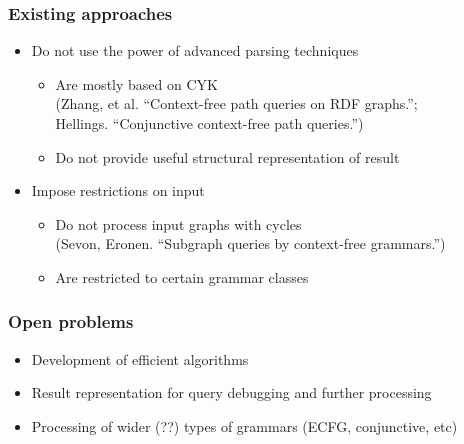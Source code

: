 \documentclass{beamer}
\begin{document}
\begin{frame}
  \transwipe[direction=90]
  \frametitle{Existing approaches}
  \begin{itemize}
    \item Do not use the power of advanced parsing techniques
    \begin{itemize}
       \item Are mostly based on CYK \\ (Zhang, et al. ``Context-free path queries on RDF graphs.''; \\ Hellings. ``Conjunctive context-free path queries.'')
       \item Do not provide useful structural representation of result
     \end{itemize}
    \item Impose restrictions on input
    \begin{itemize}
       \item Do not process input graphs with cycles \\ (Sevon, Eronen. ``Subgraph queries by context-free grammars.'')
       \item Are restricted to certain grammar classes
     \end{itemize}
  \end{itemize}
\end{frame}

\begin{frame}
  \transwipe[direction=90]
  \frametitle{Open problems}
  \begin{itemize}
    \item Development of efficient algorithms
    \item Result representation for query debugging and further processing 
    \item Processing of wider (??) types of grammars (ECFG, conjunctive, etc)
  \end{itemize}
\end{frame}

\end{document}
